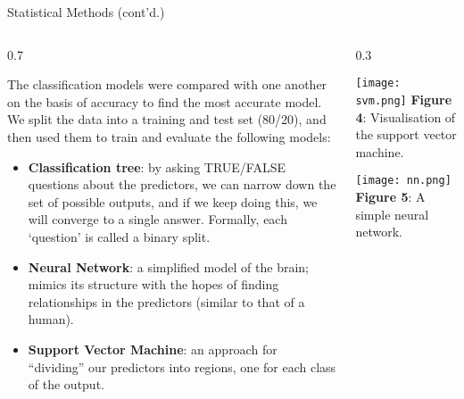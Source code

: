 \documentclass[
  ignorenonframetext,
]{beamer}
\def\begincols{\begin{columns}}
\def\begincol{\begin{column}}
\def\endcol{\end{column}}
\def\endcols{\end{columns}}
\begin{document}
\begin{frame}{Statistical Methods (cont'd.)}
\protect\hypertarget{statistical-methods-contd.}{}

\begincols
\begincol{0.7\textwidth}
\fontsize{9}{12.2}\selectfont

The classification models were compared with one another on the basis of
accuracy to find the most accurate model. We split the data into a
training and test set (80/20), and then used them to train and evaluate
the following models:

\begin{itemize}
\item
  \textbf{Classification tree}: by asking TRUE/FALSE questions about the
  predictors, we can narrow down the set of possible outputs, and if we
  keep doing this, we will converge to a single answer. Formally, each
  `question' is called a binary split.
\item
  \textbf{Neural Network}: a simplified model of the brain; mimics its
  structure with the hopes of finding relationships in the predictors
  (similar to that of a human).
\item
  \textbf{Support Vector Machine}: an approach for ``dividing'' our
  predictors into regions, one for each class of the output.
\end{itemize}

\endcol
\begincol{0.3\textwidth}
\fontsize{6}{7.2}\selectfont

\texttt{[image: svm.png]}
\textbf{Figure 4}: Visualisation of the support vector machine.
\vspace{1em}

\texttt{[image: nn.png]}
\textbf{Figure 5}: A simple neural network. \endcol \endcols

\end{frame}
\end{document}

